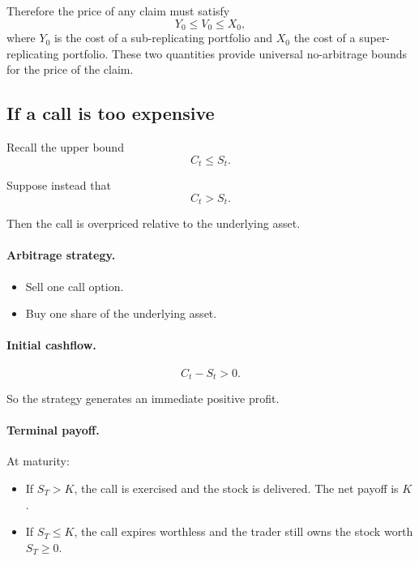 \documentclass[11pt]{article}
\newcommand{\1}{\mathbf{1}}
\theoremstyle{plain}
\theoremstyle{definition}
\theoremstyle{remark}
\begin{document}
Therefore the price of any claim must satisfy
\[
Y_0 \le V_0 \le X_0,
\]
where \(Y_0\) is the cost of a sub-replicating portfolio and \(X_0\) the
cost of a super-replicating portfolio.
These two quantities provide universal no-arbitrage bounds for the
price of the claim.


\subsection{If a call is too expensive}

Recall the upper bound
\[
C_t \le S_t .
\]

Suppose instead that
\[
C_t > S_t .
\]

Then the call is overpriced relative to the underlying asset.

\paragraph{Arbitrage strategy.}

\begin{itemize}[leftmargin=1.4em]
\item Sell one call option.
\item Buy one share of the underlying asset.
\end{itemize}

\paragraph{Initial cashflow.}

\[
C_t - S_t > 0.
\]

So the strategy generates an immediate positive profit.

\paragraph{Terminal payoff.}

At maturity:

\begin{itemize}[leftmargin=1.4em]
\item If \(S_T>K\), the call is exercised and the stock is delivered.
The net payoff is \(K\).
\item If \(S_T\le K\), the call expires worthless and the trader still
owns the stock worth \(S_T\ge0\).
\end{itemize}
\end{document}
